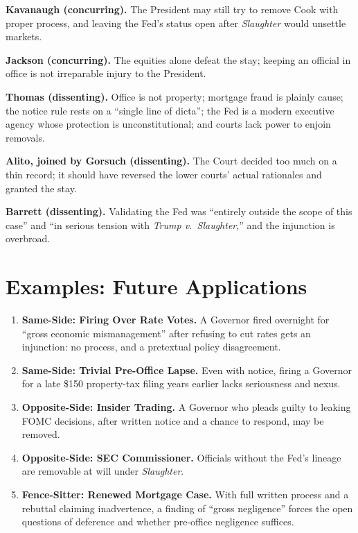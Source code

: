 \documentclass[12pt]{article}
\begin{document}
\textbf{Kavanaugh (concurring).} The President may still try to remove Cook with proper process, and leaving the Fed's status open after \textit{Slaughter} would unsettle markets.

\textbf{Jackson (concurring).} The equities alone defeat the stay; keeping an official in office is not irreparable injury to the President.

\textbf{Thomas (dissenting).} Office is not property; mortgage fraud is plainly cause; the notice rule rests on a ``single line of dicta''; the Fed is a modern executive agency whose protection is unconstitutional; and courts lack power to enjoin removals.

\textbf{Alito, joined by Gorsuch (dissenting).} The Court decided too much on a thin record; it should have reversed the lower courts' actual rationales and granted the stay.

\textbf{Barrett (dissenting).} Validating the Fed was ``entirely outside the scope of this case'' and ``in serious tension with \textit{Trump v.\ Slaughter},'' and the injunction is overbroad.

\section{Examples: Future Applications}

\begin{enumerate}
\item \textbf{Same-Side: Firing Over Rate Votes.} A Governor fired overnight for ``gross economic mismanagement'' after refusing to cut rates gets an injunction: no process, and a pretextual policy disagreement.
\item \textbf{Same-Side: Trivial Pre-Office Lapse.} Even with notice, firing a Governor for a late \$150 property-tax filing years earlier lacks seriousness and nexus.
\item \textbf{Opposite-Side: Insider Trading.} A Governor who pleads guilty to leaking FOMC decisions, after written notice and a chance to respond, may be removed.
\item \textbf{Opposite-Side: SEC Commissioner.} Officials without the Fed's lineage are removable at will under \textit{Slaughter}.
\item \textbf{Fence-Sitter: Renewed Mortgage Case.} With full written process and a rebuttal claiming inadvertence, a finding of ``gross negligence'' forces the open questions of deference and whether pre-office negligence suffices.
\end{enumerate}
\end{document}
